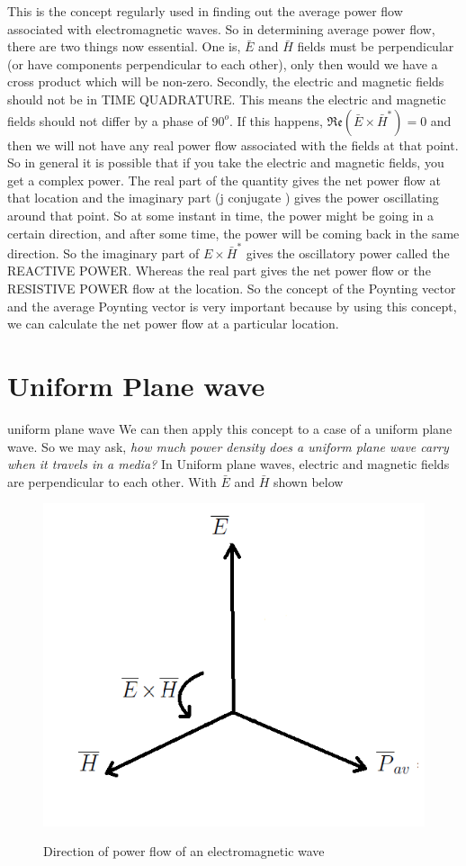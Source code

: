 This is the concept regularly used in finding out the average power flow associated with electromagnetic waves. So in determining average power flow, there are two things now essential. One is, $ \bar{E} $ and $ \bar{H} $ fields must be perpendicular (or have components perpendicular to each other), only then would we have a cross product which will be non-zero. Secondly, the electric and magnetic fields should not be in TIME QUADRATURE. This means the electric and magnetic fields should not differ by a phase of $90^{o}$. If this happens, $ \mathfrak{Re}(\bar{E}\times\bar{H}^{*})=0 $ and then we will not have any real power flow associated with the fields at that point. So in general it is possible that if you take the electric and magnetic fields, you get a complex power. The real part of the quantity gives the net power flow at that location and the imaginary part (j conjugate ) gives the power oscillating around that point. So at some instant in time, the power might be going in a certain direction, and after some time, the power will be coming back in the same direction. So the imaginary part of $ E\times\bar{H}^{*} $ gives the oscillatory power called the REACTIVE POWER. Whereas the real part gives the net power flow or the RESISTIVE POWER flow at the location. So the concept of the Poynting vector and the average Poynting vector is very important because by using this concept, we can calculate the net power flow at a particular location.

\section{Uniform Plane wave}uniform plane wave
We can then apply this concept to a case of a uniform plane wave. So we may ask, \emph{how much power density does a uniform plane wave carry when it travels in a media?} In Uniform plane waves, electric and magnetic fields are perpendicular to each other. With $ \bar{E} $ and $ \bar{H} $ shown below
\begin{figure}[h]
\centering
\textsc{\includegraphics[width=.7\linewidth]{graphics/cc}}
\caption{Direction of power flow of an electromagnetic wave}
\end{figure}


